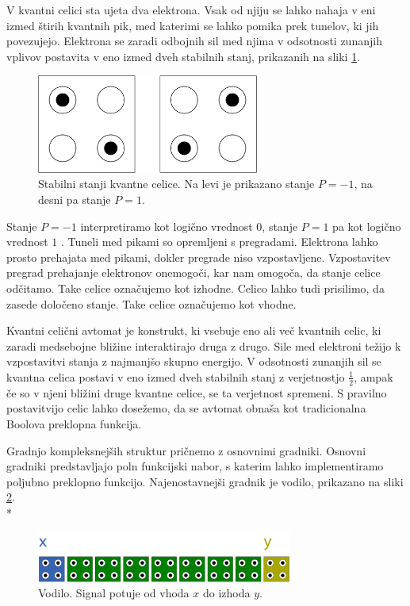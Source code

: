 \documentclass[a4paper, 11pt]{article}
\begin{document}
V kvantni celici sta ujeta dva elektrona.
Vsak od njiju se lahko nahaja v eni izmed štirih kvantnih pik, med katerimi se lahko pomika prek tunelov, ki jih povezujejo.
Elektrona se zaradi odbojnih sil med njima v odsotnosti zunanjih vplivov postavita v eno izmed dveh stabilnih stanj, prikazanih na sliki \ref{img-pregled-2states}.

\begin{figure}[h]
	\centering
	\includegraphics[width=0.65\textwidth]{../img/pregled/2states.pdf}
	\caption{Stabilni stanji kvantne celice. Na levi je prikazano stanje $P = -1$, na desni pa stanje $P = 1$.}
	\label{img-pregled-2states}
\end{figure}

Stanje $P = -1$ interpretiramo kot logično vrednost $0$, stanje $P = 1$ pa kot logično vrednost $1$ \cite{lent_1993}.
Tuneli med pikami so opremljeni s pregradami.
Elektrona lahko prosto prehajata med pikami, dokler pregrade niso vzpostavljene.
Vzpostavitev pregrad prehajanje elektronov onemogoči, kar nam omogoča, da stanje celice odčitamo.
Take celice označujemo kot izhodne.
Celico lahko tudi prisilimo, da zasede določeno stanje.
Take celice označu\-je\-mo kot vhodne.

Kvantni celični avtomat je konstrukt, ki vsebuje eno ali več kvantnih celic, ki zaradi medsebojne bližine interaktirajo druga z drugo.
Sile med elektroni težijo k vzpostavitvi stanja z najmanjšo skupno energijo.
V odsotnosti zunanjih sil se kvantna celica postavi v eno izmed dveh stabilnih stanj z verjetnostjo $\frac{1}{2}$, ampak če so v njeni bližini druge kvantne celice, se ta verjetnost spremeni.
S pravilno postavitvijo celic lahko dosežemo, da se avtomat obnaša kot tradicionalna Boolova preklopna funkcija.

Gradnjo kompleksnejših struktur pričnemo z osnovnimi gradniki.
Osnovni gradniki predstavljajo poln funkcijski nabor, s katerim lahko implementiramo poljubno preklopno funkcijo.
Najenostavnejši gradnik je vodilo, prikazano na sliki \ref{img-pregled-bus}. \\*

\begin{figure}[h]
	\centering
	\includegraphics[width=0.75\textwidth]{../img/pregled/bus.pdf}
	\caption{Vodilo. Signal potuje od vhoda $x$ do izhoda $y$.}
	\label{img-pregled-bus}
\end{figure}
\end{document}
